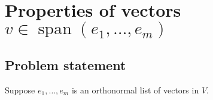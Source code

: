 \documentclass{article}
\begin{document}
\clearpage

\section{Properties of vectors $v\in\operatorname{span}(e_1,\ldots,e_m)$}
\subsection*{Problem statement}
Suppose $e_1,\ldots,e_m$ is an orthonormal list of vectors in $V$. 
\end{document}
